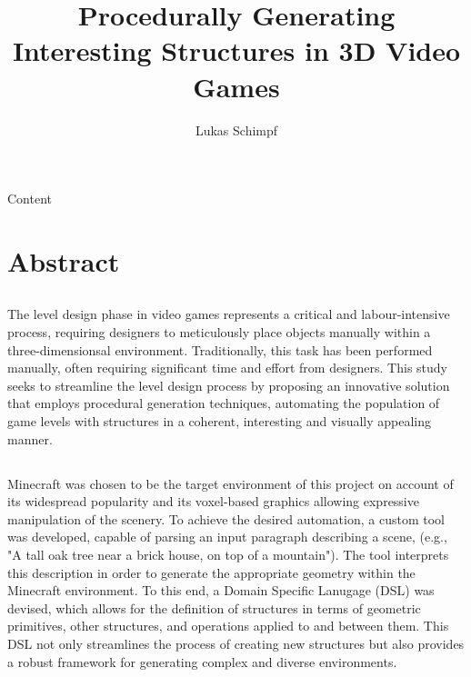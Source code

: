 \documentclass{fict}
\title{Procedurally Generating Interesting Structures in 3D Video Games}
\author{Lukas Schimpf}
\begin{document}
\begin{flushleft}
Content
\pagebreak

\section*{Abstract}

    \subsection*{}
    The level design phase in video games represents a critical and labour-intensive process, requiring designers to meticulously place objects manually within a three-dimensionsal environment.
    Traditionally, this task has been performed manually, often requiring significant time and effort from designers.
    This study seeks to streamline the level design process by proposing an innovative solution that employs procedural generation techniques, automating the population of game levels with structures in a coherent, interesting and visually appealing manner.


    \subsection*{}
    Minecraft was chosen to be the target environment of this project on account of its widespread popularity and its voxel-based graphics allowing expressive manipulation of the scenery.
    To achieve the desired automation, a custom tool was developed, capable of parsing an input paragraph describing a scene, (e.g., "A tall oak tree near a brick house, on top of a mountain"). The tool interprets this description in order to generate the appropriate geometry within the Minecraft environment.
    To this end, a Domain Specific Lanugage (DSL) was devised, which allows for the definition of structures in terms of geometric primitives, other structures, and operations applied to and between them.
    This DSL not only streamlines the process of creating new structures but also provides a robust framework for generating complex and diverse environments.



\end{flushleft}
\end{document}
